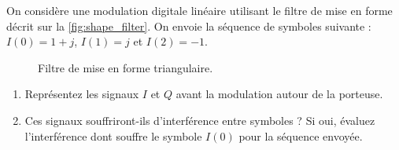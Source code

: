 \documentclass [a4paper, 11pt] {article}
\begin{document}
    \begin{exercice}{3}
        On considère une modulation digitale linéaire utilisant le filtre de mise en forme décrit sur la \autoref{fig:shape_filter}. On envoie la séquence de symboles suivante : $I(0) = 1 + j$, $I(1) = j$ et $I(2) = -1$.
        
        \begin{figure}[H]
            \centering
            \caption{Filtre de mise en forme triangulaire.}
            \label{fig:shape_filter}
        \end{figure}
        
        \begin{enumerate}
            \item Représentez les signaux $I$ et $Q$ avant la modulation autour de la porteuse.
            \item Ces signaux souffriront-ils d'interférence entre symboles ? Si oui, évaluez l'interférence dont souffre le symbole $I(0)$ pour la séquence envoyée.
        \end{enumerate}
    \end{exercice}
    
\end{document}
